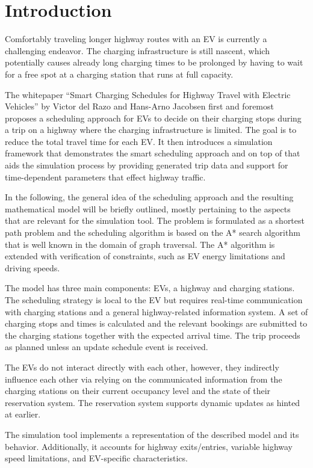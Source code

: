 \documentclass[hidelinks]{sig-alternate}
\begin{document}
\section{Introduction}


Comfortably traveling longer highway routes with an EV is currently a challenging endeavor. The charging
infrastructure is still nascent, which potentially causes already long charging times to be prolonged by having to
wait for a free spot at a charging station that runs at full capacity.

The whitepaper ``Smart Charging Schedules for Highway Travel with Electric Vehicles'' \cite{3} by Victor del Razo and
Hans-Arno Jacobsen first and foremost proposes a scheduling approach for EVs to decide on their charging stops during
a trip on a highway where the charging infrastructure is limited. The goal is to reduce the total travel time for
each EV. It then introduces a simulation framework that demonstrates the smart scheduling approach and on top of that
aids the simulation process by providing generated trip data and support for time-dependent parameters that effect
highway traffic.

In the following, the general idea of the scheduling approach and the resulting mathematical model will be briefly
outlined, mostly pertaining to the aspects that are relevant for the simulation tool. The problem is formulated as a
shortest path problem and the scheduling algorithm is based on the A* search algorithm that is well known in the
domain of graph traversal. The A* algorithm is extended with verification of constraints, such as EV energy
limitations and driving speeds.

The model has three main components: EVs, a highway and charging stations. The scheduling strategy is local to the EV
but requires real-time communication with charging stations and a general highway-related information system. A set
of charging stops and times is calculated and the relevant bookings are submitted to the charging stations together
with the expected arrival time. The trip proceeds as planned unless an update schedule event is received.

The EVs do not interact directly with each other, however, they indirectly influence each other via relying on the
communicated information from the charging stations on their current occupancy level and the state of their reservation
system. The reservation system supports dynamic updates as hinted at earlier.

The simulation tool implements a representation of the described model and its behavior. Additionally, it accounts for
highway exits/entries, variable highway speed limitations, and EV-specific characteristics.
\end{document}

